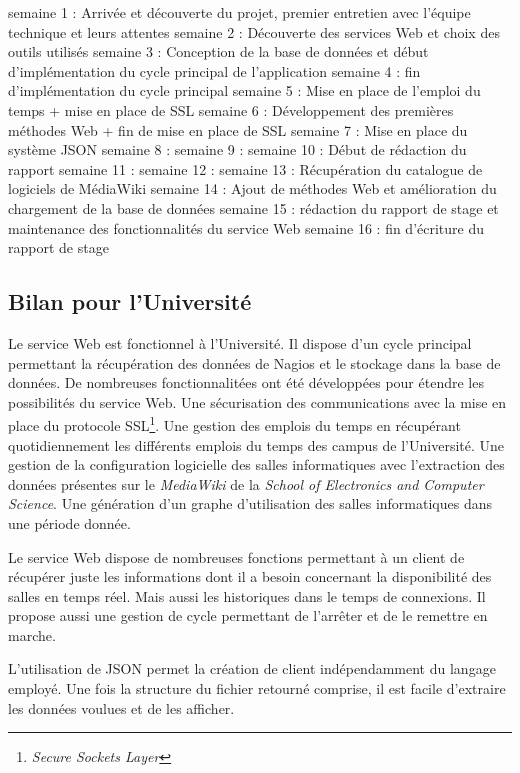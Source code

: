 semaine 1 : Arriv\'ee et d\'ecouverte du projet, premier entretien avec l'\'equipe technique et leurs attentes
semaine 2 : D\'ecouverte des services Web et choix des outils utilis\'es
semaine 3 : Conception de la base de donn\'ees et d\'ebut d'impl\'ementation du cycle principal de l'application
semaine 4 : fin d'impl\'ementation du cycle principal
semaine 5 : Mise en place de l'emploi du temps + mise en place de SSL
semaine 6 : D\'eveloppement des premi\`eres m\'ethodes Web + fin de mise en place de SSL
semaine 7 : Mise en place du syst\`eme JSON
semaine 8 : 
semaine 9 : 
semaine 10 : D\'ebut de r\'edaction du rapport
semaine 11 : 
semaine 12 : 
semaine 13 : R\'ecup\'eration du catalogue de logiciels de M\'ediaWiki
semaine 14 : Ajout de m\'ethodes Web et am\'elioration du chargement de la base de donn\'ees
semaine 15 : r\'edaction du rapport de stage et maintenance des fonctionnalit\'es du service Web
semaine 16 : fin d'\'ecriture du rapport de stage

\subsection{Bilan pour l'Universit\'e}

Le service Web est fonctionnel \`a l'Universit\'e.
Il dispose d'un cycle principal permettant la r\'ecup\'eration des donn\'ees de Nagios et le stockage dans la base de donn\'ees.
De nombreuses fonctionnalit\'ees ont \'et\'e d\'evelopp\'ees pour \'etendre les possibilit\'es du service Web.
Une s\'ecurisation des communications avec la mise en place du protocole SSL\protect\footnote{\textit{Secure Sockets Layer}}.
Une gestion des emplois du temps en r\'ecup\'erant quotidiennement les diff\'erents emplois du temps des campus de l'Universit\'e.
Une gestion de la configuration logicielle des salles informatiques avec l'extraction des donn\'ees pr\'esentes sur le \textit{MediaWiki} de la \textit{School of Electronics and Computer Science}.
Une g\'en\'eration d'un graphe d'utilisation des salles informatiques dans une p\'eriode donn\'ee.

Le service Web dispose de nombreuses fonctions permettant \`a un client de r\'ecup\'erer juste les informations dont il a besoin concernant la disponibilit\'e des salles en temps r\'eel.
Mais aussi les historiques dans le temps de connexions.
Il propose aussi une gestion de cycle permettant de l'arr\^eter et de le remettre en marche.

L'utilisation de JSON permet la cr\'eation de client ind\'ependamment du langage employ\'e.
Une fois la structure du fichier retourn\'e comprise, il est facile d'extraire les donn\'ees voulues et de les afficher.

